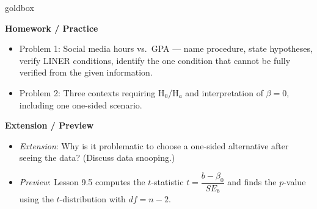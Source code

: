 \documentclass[10pt]{article}
\begin{document}
\begin{skillbox}{goldbox}
\begin{minipage}[t]{0.48\linewidth}
    \textbf{Homework / Practice}
    \begin{itemize}
        \item Problem 1: Social media hours vs.\ GPA --- name procedure, state
              hypotheses, verify LINER conditions, identify the one condition that
              cannot be fully verified from the given information.
        \item Problem 2: Three contexts requiring H$_0$/H$_a$ and interpretation
              of $\beta = 0$, including one one-sided scenario.
    \end{itemize}
\end{minipage}
\hfill
\begin{minipage}[t]{0.48\linewidth}
    \textbf{Extension / Preview}
    \begin{itemize}
        \item \textit{Extension}: Why is it problematic to choose a one-sided
              alternative after seeing the data? (Discuss data snooping.)
        \item \textit{Preview}: Lesson 9.5 computes the $t$-statistic
              $t = \dfrac{b - \beta_0}{SE_b}$ and finds the $p$-value using
              the $t$-distribution with $df = n - 2$.
    \end{itemize}
\end{minipage}
\end{skillbox}
\end{document}
